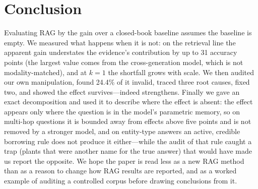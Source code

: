 \documentclass[11pt]{article}
\begin{document}
\section{Conclusion}
Evaluating RAG by the gain over a closed-book baseline assumes the baseline is empty.
We measured what happens when it is not: on the retrieval line the apparent gain
understates the evidence's contribution by up to 31 accuracy points (the largest value
comes from the cross-generation model, which is not modality-matched), and at $k{=}1$ the
shortfall grows with scale.
We then audited our own manipulation, found 24.4\% of it invalid, traced three root causes,
fixed two, and showed the effect survives---indeed strengthens.
Finally we gave an exact decomposition and used it to describe where the effect is absent:
the effect appears only where the question is in the model's parametric memory, so on
multi-hop questions it is bounded away from effects above five points and is not removed
by a stronger model, and on entity-type answers an active, credible borrowing rule does not
produce it either---while the audit of that rule caught a trap (plants that were another
name for the true answer) that would have made us report the opposite. We hope the paper is read
less as a new RAG method than as a reason to change how RAG results are reported, and as a
worked example of auditing a controlled corpus before drawing conclusions from it.




\appendix

\end{document}
